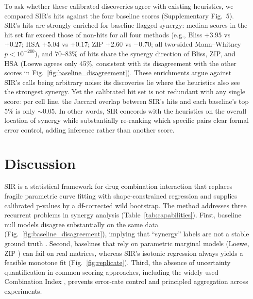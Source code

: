 \documentclass[unnumsec,webpdf,contemporary,large]{oup-authoring-template}
\begin{document}
To ask whether these calibrated discoveries agree with existing heuristics, we compared SIR's hits against the four baseline scores (Supplementary Fig.~5).
SIR's hits are strongly enriched for baseline-flagged synergy: median scores in the hit set far exceed those of non-hits for all four methods (e.g., Bliss $+3.95$ vs $+0.27$; HSA $+5.04$ vs $+0.17$; ZIP $+2.60$ vs $-0.70$; all two-sided Mann--Whitney $p<10^{-200}$), and 70--83\% of hits share the synergy direction of Bliss, ZIP, and HSA (Loewe agrees only 45\%, consistent with its disagreement with the other scores in Fig.~\ref{fig:baseline_disagreement}).
These enrichments argue against SIR's calls being arbitrary noise: its discoveries lie where the heuristics also see the strongest synergy.
Yet the calibrated hit set is not redundant with any single score: per cell line, the Jaccard overlap between SIR's hits and each baseline's top 5\% is only $\sim$0.05.
In other words, SIR concords with the heuristics on the overall location of synergy while substantially re-ranking which specific pairs clear formal error control, adding inference rather than another score.

\section{Discussion}

SIR is a statistical framework for drug combination interaction that replaces fragile parametric curve fitting with shape-constrained regression and supplies calibrated p-values by a df-corrected wild bootstrap.
The method addresses three recurrent problems in synergy analysis (Table~\ref{tab:capabilities}).
First, baseline null models disagree substantially on the same data (Fig.~\ref{fig:baseline_disagreement}), implying that ``synergy'' labels are not a stable ground truth \cite{Foucquier2015,Berenbaum1989}.
Second, baselines that rely on parametric marginal models (Loewe, ZIP \cite{Yadav2015}) can fail on real matrices, whereas SIR's isotonic regression \cite{Robertson1988} always yields a feasible monotone fit (Fig.~\ref{fig:replicate}).
Third, the absence of uncertainty quantification in common scoring approaches, including the widely used Combination Index \cite{Chou1984,Chou2010}, prevents error-rate control and principled aggregation across experiments.
\end{document}
